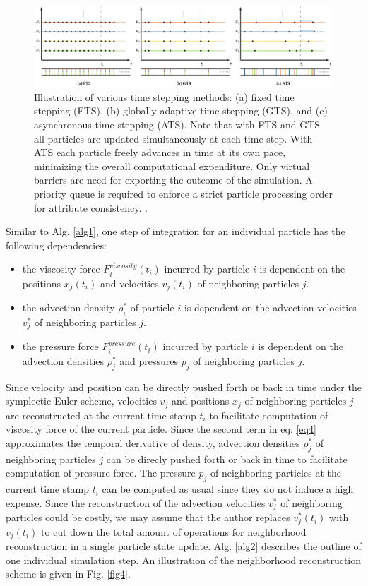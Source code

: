 \documentclass[
	11pt, 
	DIV10,
	ngerman,
	a4paper, 
	oneside, 
	headings=normal, 
	captions=tableheading,
	final, 
	numbers=noenddot
]{scrartcl}
\begin{document}
\begin{figure}[tb]
	\centering
	\includegraphics[scale=0.16]{images/4}
	\caption{\label{fig3} Illustration of various time stepping methods: (a) fixed time stepping (FTS), (b) globally adaptive time stepping (GTS), and (c) asynchronous time stepping (ATS). Note that with FTS and GTS all particles are updated simultaneously at each time step. With ATS each particle freely advances in time at its own pace, minimizing the overall computational expenditure. Only virtual barriers are need for exporting the outcome of the simulation. A priority queue is required to enforce a strict particle processing order for attribute consistency. \cite{reinhardt2017fully}.}
\end{figure}

\par
Similar to Alg. \ref{alg1}, one step of integration for an individual particle has the following dependencies:

\begin{itemize}
    \item the viscosity force $ F_{i}^{viscosity}(t_{i}) $ incurred by particle $i$ is dependent on the positions $ x_{j}(t_{i}) $ and velocities $ v_{j}(t_{i}) $ of neighboring particles $j$.
    \item the advection density $ \rho_{i}^{*} $ of particle $i$ is dependent on the advection velocities $ v_{j}^{*} $ of neighboring particles $j$.
    \item the pressure force $ F_{i}^{pressure}(t_{i}) $ incurred by particle $i$ is dependent on the advection densities $ \rho_{j}^{*} $ and pressures $ p_{j} $ of neighboring particles $j$.
\end{itemize}

Since velocity and position can be directly pushed forth or back in time under the symplectic Euler scheme, velocities $ v_{j} $ and positions $ x_{j} $ of neighboring particles $j$ are reconstructed at the current time stamp $ t_{i} $ to facilitate computation of viscosity force of the current particle. Since the second term in eq. \ref{eq4} approximates the temporal derivative of density, advection densities $ \rho_{j}^{*} $ of neighboring particles $j$ can be direcly pushed forth or back in time to facilitate computation of pressure force. The pressure $ p_{j} $ of neighboring particles at the current time stamp $ t_{i} $ can be computed as usual since they do not induce a high expense. Since the reconstruction of the advection velocities $ v_{j}^{*} $ of neighboring particles could be costly, we may assume that the author replaces $ v_{j}^{*}(t_{i}) $ with $ v_{j}(t_{i}) $ to cut down the total amount of operations for neighborhood reconstruction in a single particle state update. Alg. \ref{alg2} describes the outline of one individual simulation step. An illustration of the neighborhood reconstruction scheme is given in Fig. \ref{fig4}.
\end{document}
